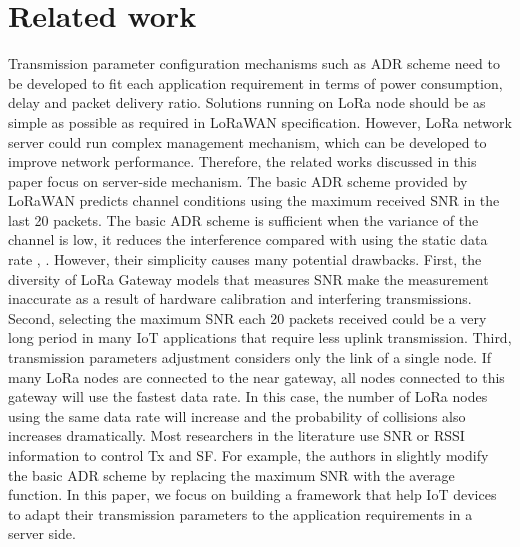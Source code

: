 \section{Related work} \label{sec:Related work}

Transmission parameter configuration mechanisms such as \ac{ADR} scheme need to be developed to fit each application requirement in terms of power consumption,
	delay and packet delivery ratio.
Solutions running on LoRa node should be as simple as possible as required in LoRaWAN specification.
However,
	LoRa network server could run complex management mechanism,
	which can be developed to improve network performance.
Therefore,
	the related works discussed in this paper focus on server-side mechanism.
The basic \ac{ADR} scheme \cite{LorawanSpecification} provided by LoRaWAN predicts channel conditions using the maximum received \ac{SNR} in the last 20 packets.
The basic \ac{ADR} scheme is sufficient when the variance of the channel is low, 
	it reduces the interference compared with using the static data rate \cite{bor_lora_2016}, \cite{slabicki_adaptive_2018}.
However,
	their simplicity causes many potential drawbacks.
First,
	the diversity of LoRa Gateway models that measures \ac{SNR} make the measurement inaccurate as a result of hardware calibration and interfering transmissions.
Second,
	selecting the maximum \ac{SNR} each 20 packets received could be a very long period in many IoT applications that require less uplink transmission.
Third,
	transmission parameters adjustment considers only the link of a single node.
If many LoRa nodes are connected to the near gateway,
	all nodes connected to this gateway will use the fastest data rate.
In this case,
	the number of LoRa nodes using the same data rate will increase and the probability of collisions also increases dramatically.
Most researchers in the literature use \ac{SNR} or \ac{RSSI} information to control \ac{Tx} and \ac{SF}.
For example,
	the authors in \cite{slabicki_adaptive_2018} slightly modify the basic \ac{ADR} scheme by replacing the maximum \ac{SNR} with the average function.
In this paper,
	we focus on building a framework that help IoT devices to adapt their transmission parameters to the application requirements in a server side.

